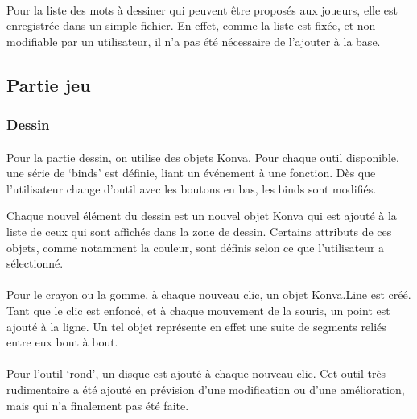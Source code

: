 \documentclass[11pt,a4paper]{article}
\begin{document}
            \paragraph{}
            Pour la liste des mots à dessiner qui peuvent être proposés aux joueurs,
            elle est enregistrée dans un simple fichier.
            En effet, comme la liste est fixée, et non modifiable par un utilisateur,
            il n'a pas été nécessaire de l'ajouter à la base.
        \subsection{Partie jeu}
            \subsubsection{Dessin}
                \paragraph{}
                Pour la partie dessin, on utilise des objets Konva.
                Pour chaque outil disponible, une série de `binds' est définie, liant un événement à une fonction.
                Dès que l'utilisateur change d'outil avec les boutons en bas, les binds sont modifiés.

                Chaque nouvel élément du dessin est un nouvel objet Konva
                qui est ajouté à la liste de ceux qui sont affichés dans la zone de dessin.
                Certains attributs de ces objets, comme notamment la couleur,
                sont définis selon ce que l'utilisateur a sélectionné.
                \paragraph{}
                Pour le crayon ou la gomme, à chaque nouveau clic, un objet Konva.Line est créé.
                Tant que le clic est enfoncé, et à chaque mouvement de la souris, un point est ajouté à la ligne.
                Un tel objet représente en effet une suite de segments reliés entre eux bout à bout.
                \paragraph{}
                Pour l'outil `rond', un disque est ajouté à chaque nouveau clic.
                Cet outil très rudimentaire a été ajouté en prévision d'une modification ou d'une amélioration,
                mais qui n'a finalement pas été faite.
\end{document}

